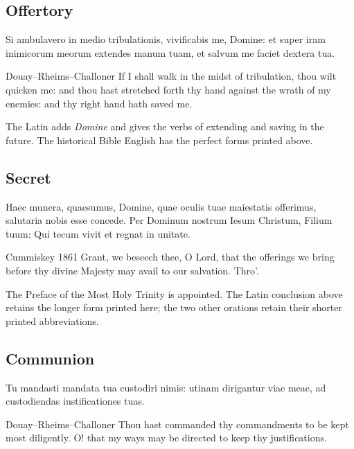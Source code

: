 \subsection{Offertory}\label{proper-offertory}
\begin{latinproper}
Si ambulavero in medio tribulationis, vivificabis me, Domine: et super iram inimicorum meorum extendes manum tuam, et salvum me faciet dextera tua.
\end{latinproper}
\begin{englishwitness}{Douay--Rheims--Challoner}
If I shall walk in the midst of tribulation, thou wilt quicken me: and thou hast stretched forth thy hand against the wrath of my enemies: and thy right hand hath saved me.
\end{englishwitness}
The Latin adds \textit{Domine} and gives the verbs of extending and saving in the future. The historical Bible English has the perfect forms printed above.

\subsection{Secret}\label{proper-secret}
\begin{latinproper}
Haec munera, quaesumus, Domine, quae oculis tuae maiestatis offerimus, salutaria nobis esse concede. Per Dominum nostrum Iesum Christum, Filium tuum: Qui tecum vivit et regnat in unitate.
\end{latinproper}
\begin{englishwitness}{Cummiskey 1861}
Grant, we beseech thee, O Lord, that the offerings we bring before thy divine Majesty may avail to our salvation. Thro’.
\end{englishwitness}
The Preface of the Most Holy Trinity is appointed. The Latin conclusion above retains the longer form printed here; the two other orations retain their shorter printed abbreviations.

\subsection{Communion}\label{proper-communion}
\begin{latinproper}
Tu mandasti mandata tua custodiri nimis: utinam dirigantur viae meae, ad custodiendas iustificationes tuas.
\end{latinproper}
\begin{englishwitness}{Douay--Rheims--Challoner}
Thou hast commanded thy commandments to be kept most diligently. O! that my ways may be directed to keep thy justifications.
\end{englishwitness}

